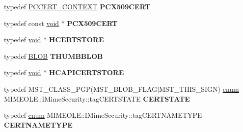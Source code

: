 \begin{DoxyCompactItemize}
\item 
\mbox{\label{interface_m_i_m_e_o_l_e_1_1_i_mime_security_ab954af15e2137efd741b61338d85f4aa}} 
typedef \hyperlink{struct___c_e_r_t___c_o_n_t_e_x_t}{P\+C\+C\+E\+R\+T\+\_\+\+C\+O\+N\+T\+E\+XT} {\bfseries P\+C\+X509\+C\+E\+RT}
\item 
\mbox{\label{interface_m_i_m_e_o_l_e_1_1_i_mime_security_a5ce444bb414a0931689966254d94faf3}} 
typedef const \hyperlink{interfacevoid}{void} $\ast$ {\bfseries P\+C\+X509\+C\+E\+RT}
\item 
\mbox{\label{interface_m_i_m_e_o_l_e_1_1_i_mime_security_aa23338d8f51c226c4f11432b7c3dcc15}} 
typedef \hyperlink{interfacevoid}{void} $\ast$ {\bfseries H\+C\+E\+R\+T\+S\+T\+O\+RE}
\item 
\mbox{\label{interface_m_i_m_e_o_l_e_1_1_i_mime_security_a1aee4092aa855cbc092582e3742592dc}} 
typedef \hyperlink{struct___b_l_o_b}{B\+L\+OB} {\bfseries T\+H\+U\+M\+B\+B\+L\+OB}
\item 
\mbox{\label{interface_m_i_m_e_o_l_e_1_1_i_mime_security_a2f9ff3fa3150ff07b46e1ca2407fcca7}} 
typedef \hyperlink{interfacevoid}{void} $\ast$ {\bfseries H\+C\+A\+P\+I\+C\+E\+R\+T\+S\+T\+O\+RE}
\item 
\mbox{\label{interface_m_i_m_e_o_l_e_1_1_i_mime_security_a99c8e96a25128fb8eb4dfc950f70ae94}} 
typedef M\+S\+T\+\_\+\+C\+L\+A\+S\+S\+\_\+\+P\+GP(M\+S\+T\+\_\+\+B\+L\+O\+B\+\_\+\+F\+L\+AG$\vert$M\+S\+T\+\_\+\+T\+H\+I\+S\+\_\+\+S\+I\+GN) \hyperlink{interfaceenum}{enum} M\+I\+M\+E\+O\+L\+E\+::\+I\+Mime\+Security\+::tag\+C\+E\+R\+T\+S\+T\+A\+TE {\bfseries C\+E\+R\+T\+S\+T\+A\+TE}
\item 
\mbox{\label{interface_m_i_m_e_o_l_e_1_1_i_mime_security_aa8e1e07cb56bff450f6d40f2cb3f8ec7}} 
typedef \hyperlink{interfaceenum}{enum} M\+I\+M\+E\+O\+L\+E\+::\+I\+Mime\+Security\+::tag\+C\+E\+R\+T\+N\+A\+M\+E\+T\+Y\+PE {\bfseries C\+E\+R\+T\+N\+A\+M\+E\+T\+Y\+PE}
\item 

\end{DoxyCompactItemize}
